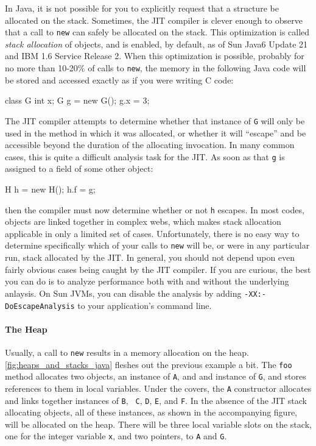 In Java, it is not possible for you to explicitly request that a structure be
allocated on the stack. Sometimes, the JIT compiler is clever enough to observe
that a call to {\tt new} can safely be allocated on the stack. This optimization
is called \emph{stack allocation} of objects, and is
enabled, by default, as of Sun Java6 Update 21 and IBM 1.6 Service Release 2.
When this optimization is possible, probably for no more than 10-20\% of calls
to {\tt new}, the memory in the following Java code will be stored and accessed
exactly as if you were writing C code:
\begin{shortlisting}
class G {
   int x;
}
G g = new G();
g.x = 3;
\end{shortlisting}
The JIT compiler attempts to determine whether that instance of {\tt G} will
only be used in the method in which it was allocated, or whether it will
``escape'' and be accessible beyond the duration of the allocating
invocation. In many common cases, this is quite a
difficult analysis task for the JIT. As soon as that {\tt g} is assigned to a
field of some other object:
\begin{shortlisting}
H h = new H();
h.f = g;
\end{shortlisting}
then the compiler must now determine whether or not {\tt h} escapes. In most
codes, objects are linked together in complex webs, which makes stack allocation
applicable in only a limited set of cases. Unfortunately, there is no easy way
to determine specifically which of your calls to {\tt new} will be, or were in
any particular run, stack allocated by the JIT. In general, you should not
depend upon even fairly obvious cases being caught by the JIT compiler. If you
are curious, the best you can do is to analyze performance both with and without
the underlying anlaysis. On Sun JVMs, you can disable the analysis by adding
{\tt -XX:-DoEscapeAnalysis} to your application's command line.

\paragraph{The Heap}
Usually, a call to {\tt new} results in a memory allocation on the heap.
\autoref{fig:heaps_and_stacks_java} fleshes out the previous example a bit. The
{\tt foo} method allocates two objects, an instance of {\tt A}, and and instance
of {\tt G}, and stores references to them in local variables. Under the covers,
the {\tt A} constructor allocates and links together instances of {\tt B}, {\tt
C}, {\tt D}, {\tt E}, and {\tt F}. In the absence of the JIT stack allocating
objects, all of these instances, as shown in the accompanying figure, will be
allocated on the heap. There will be three local variable slots on the stack,
one for the integer variable {\tt x}, and two pointers, to {\tt A} and {\tt G}.  

